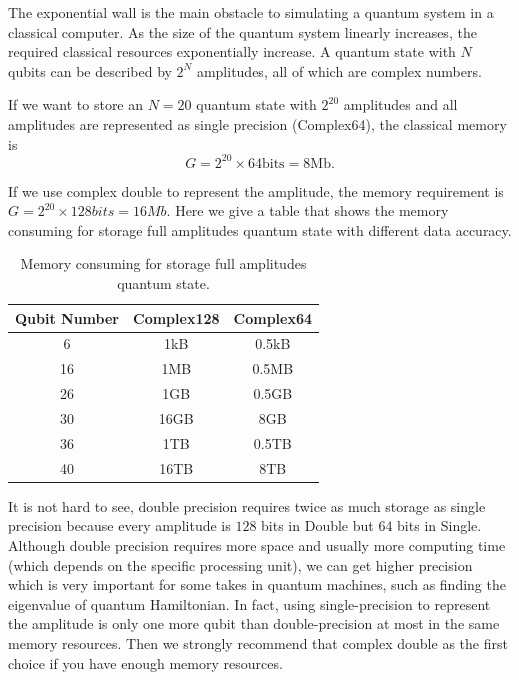 The exponential wall is the main obstacle to simulating a quantum system in a classical computer.
As the size of the quantum system linearly increases, the required classical resources exponentially increase.
A quantum state with $N$ qubits can be described by $2^N$ amplitudes, all of which are complex numbers.

If we want to store an $N=20$ quantum state with $2^{20}$ amplitudes and all amplitudes are represented as single precision (Complex64), the classical memory is
\begin{equation}
    G=2^{20}\times 64 \mathrm{bits} = 8 \mathrm{Mb}.
\end{equation}

If we use complex double to represent the amplitude, the memory requirement is $G=2^{20}\times 128 bits=16 Mb$. Here we give a table that shows the memory consuming for storage full amplitudes quantum state with different data accuracy.

\begin{table}[ht]
    \begin{tabular}{ccc}
        \toprule
        Qubit Number & Complex128 & Complex64 \\
        \midrule
        6            & 1kB        & 0.5kB     \\
        16           & 1MB        & 0.5MB     \\
        26           & 1GB        & 0.5GB     \\
        30           & 16GB       & 8GB       \\
        36           & 1TB        & 0.5TB     \\
        40           & 16TB       & 8TB       \\
        \bottomrule
    \end{tabular}
    \caption{Memory consuming for storage full amplitudes quantum state.}
    \label{tab:mem_consume}
\end{table}

It is not hard to see, double precision requires twice as much storage as single precision because every amplitude is $128$ bits in Double but $64$ bits in Single.
Although double precision requires more space and usually more computing time (which depends on the specific processing unit), we can get higher precision which is very important for some takes in quantum machines, such as finding the eigenvalue of quantum Hamiltonian.
In fact, using single-precision to represent the amplitude is only one more qubit than double-precision at most in the same memory resources.
Then we strongly recommend that complex double as the first choice if you have enough memory resources.